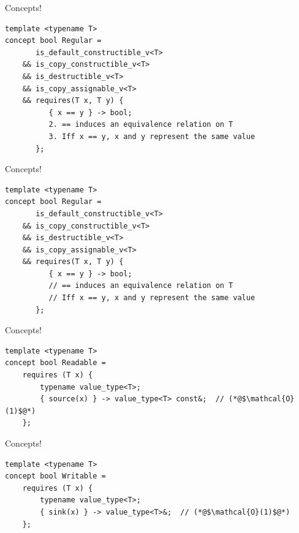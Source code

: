 \documentclass[aspectratio=169]{beamer}
\begin{document}

\begin{frame}[fragile]{Concepts!}
\begin{lstlisting}
template <typename T>
concept bool Regular =
       is_default_constructible_v<T>
    && is_copy_constructible_v<T>
    && is_destructible_v<T>
    && is_copy_assignable_v<T>
    && requires(T x, T y) {
          { x == y } -> bool;
          2. == induces an equivalence relation on T
          3. Iff x == y, x and y represent the same value
       };
\end{lstlisting}
\end{frame}


\begin{frame}[fragile]{Concepts!}
\begin{lstlisting}
template <typename T>
concept bool Regular =
       is_default_constructible_v<T>
    && is_copy_constructible_v<T>
    && is_destructible_v<T>
    && is_copy_assignable_v<T>
    && requires(T x, T y) {
          { x == y } -> bool;
          // == induces an equivalence relation on T
          // Iff x == y, x and y represent the same value
       };
\end{lstlisting}
\end{frame}


\begin{frame}[fragile]{Concepts!}
\begin{lstlisting}
template <typename T>
concept bool Readable =
    requires (T x) {
        typename value_type<T>;
        { source(x) } -> value_type<T> const&;  // (*@$\mathcal{O}(1)$@*)
    };
\end{lstlisting}
\end{frame}


\begin{frame}[fragile]{Concepts!}
\begin{lstlisting}
template <typename T>
concept bool Writable =
    requires (T x) {
        typename value_type<T>;
        { sink(x) } -> value_type<T>&;  // (*@$\mathcal{O}(1)$@*)
    };
\end{lstlisting}
\end{frame}
\end{document}
